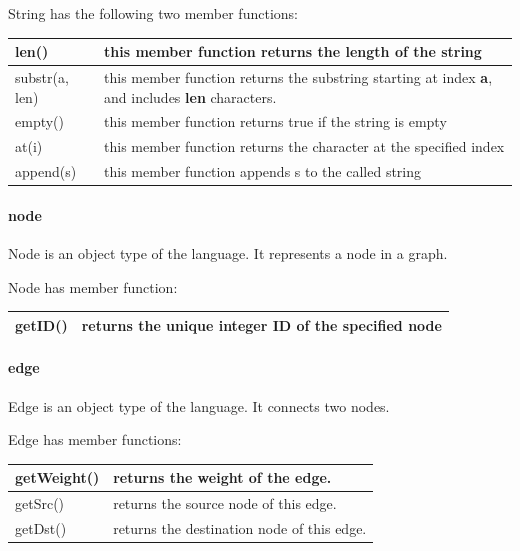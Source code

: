 \documentclass[a4paper,12pt]{article}
\begin{document}
String has the following two member functions:
\begin{center}
\begin{tabular}{| l | p{10cm} |}
\hline
	len()		& this member function returns the length of the string \\ \hline
	substr(a, len)  & this member function returns the substring starting at index \textbf{a}, and includes \textbf{len} characters. \\ \hline
	empty()	& this member function returns true if the string is empty \\ \hline
	at(i)		& this member function returns the character at the specified index \\ \hline
	append(s)  & this member function appends s to the called string \\ \hline
\end{tabular}
\end{center}

\paragraph{node}

	Node is an object type of the language. It represents a node in a graph.
	
	Node has member function:
\begin{center}
\begin{tabular}{| l | p{10cm} |}
\hline
getID()	&	returns the unique integer ID of the specified node \\ \hline
\end{tabular}
\end{center}

\paragraph{edge}

	Edge is an object type of the language. It connects two nodes.
	
	Edge has member functions:
\begin{center}
\begin{tabular}{| l | p{10cm} |}
\hline
		getWeight()	&	returns the weight of the edge. \\ \hline
		getSrc()  	&      returns the source node of this edge. \\ \hline
		getDst()	&	returns the destination node of this edge. \\ \hline
		
\end{tabular}
\end{center}
		
\end{document}
